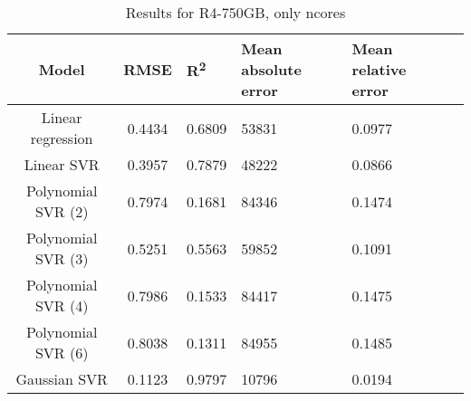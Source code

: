 \begin{table}[H]
\centering
\begin{adjustbox}{center}
\begin{tabular}{c | c M{1.2cm} M{2.5cm} M{2.5cm} M{1.8cm}}
Model & RMSE & R\textsuperscript{2} & Mean absolute error & Mean relative error \tabularnewline
\hline
Linear regression & 0.4434 & 0.6809 &  53831 & 0.0977 \\
Linear SVR & 0.3957 & 0.7879 &  48222 & 0.0866 \\
Polynomial SVR (2) & 0.7974 & 0.1681 &  84346 & 0.1474 \\
Polynomial SVR (3) & 0.5251 & 0.5563 &  59852 & 0.1091 \\
Polynomial SVR (4) & 0.7986 & 0.1533 &  84417 & 0.1475 \\
Polynomial SVR (6) & 0.8038 & 0.1311 &  84955 & 0.1485 \\
Gaussian SVR & 0.1123 & 0.9797 &  10796 & 0.0194 \\
\end{tabular}
\end{adjustbox}
\\
\caption{Results for R4-750GB, only ncores}
\label{tab:only_1_linear_R4_750}
\end{table}
